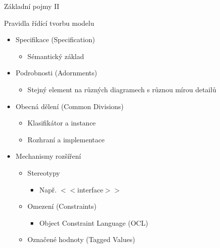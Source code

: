 \begin{frame}{Základní pojmy II}


 Pravidla řídící tvorbu modelu

\begin{itemize}
	\item Specifikace (Specification)
	\onslide<6->
	\begin{itemize}
		\item Sémantický základ
	\end{itemize}
	
	\item Podrobnosti (Adornments)
	\onslide<7->
	\begin{itemize}
		\item Stejný element na různých diagramech s různou mírou detailů
	\end{itemize}
	
	\item Obecná dělení (Common Divisions)
	\onslide<8->
	\begin{itemize}
		\item Klasifikátor a instance
		\item Rozhraní a implementace
	\end{itemize}
	
	\item Mechanismy rozšíření
	\onslide<9->
	\begin{itemize}
		\item Stereotypy
		\begin{itemize}
			\item Např. $<<$interface$>>$
		\end{itemize}
		\item Omezení (Constraints)
		\begin{itemize}
			\item Object Constraint Language (OCL)
		\end{itemize}
		\item Označené hodnoty (Tagged Values)
	\end{itemize}
\end{itemize}
	
\end{frame}



